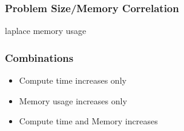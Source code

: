 \begin{frame}
		\frametitle{Problem Size/Memory Correlation}
		laplace memory usage
\end{frame}

\begin{frame}
		\frametitle{Combinations}
		\begin{itemize}
				\item Compute time increases only
				\item Memory usage increases only
				\item Compute time and Memory increases
		\end{itemize}
\end{frame}
